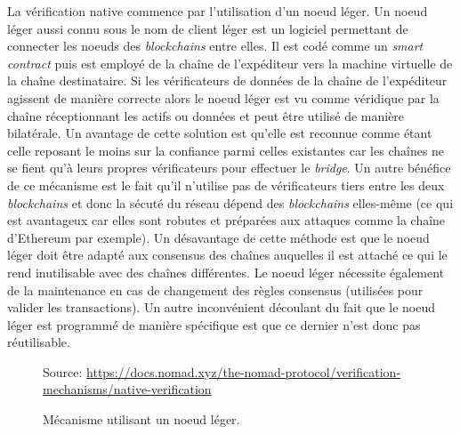 La vérification native commence par l’utilisation d’un \gls{noeud léger}. \cite{NomadDocsNative} Un noeud léger aussi connu sous le nom de client léger est un logiciel permettant de connecter les noeuds des \textit{\gls{blockchain}s} entre elles. Il est codé comme un \textit{\gls{smart contract}} puis est employé de la chaîne de l'expéditeur vers la machine virtuelle de la chaîne destinataire. Si les \gls{vérificateur}s de données de la chaîne de l'expéditeur agissent de manière correcte alors le noeud léger est vu comme véridique par la chaîne réceptionnant les \gls{actif}s ou données et peut être utilisé de manière bilatérale.
 Un avantage de cette solution est qu’elle est reconnue comme étant celle reposant le moins sur la confiance parmi celles existantes car les chaînes ne se fient qu’à leurs propres \gls{vérificateur}s pour effectuer le \textit{bridge}. Un autre bénéfice de ce mécanisme est le fait qu’il n’utilise pas de \gls{vérificateur}s tiers entre les deux \textit{\gls{blockchain}s} et donc la sécuté du réseau dépend des \textit{\gls{blockchain}s} elles-même (ce qui est avantageux car elles sont robutes et préparées aux attaques comme la chaîne d’Ethereum par exemple).
 Un désavantage de cette méthode est que le noeud léger doit être adapté aux consensus des chaînes auquelles il est attaché ce qui le rend inutilisable avec des chaînes différentes. Le noeud léger nécessite également de la maintenance en cas de changement des règles consensus (utilisées pour valider les transactions). Un autre inconvénient découlant du fait que le noeud léger est programmé de manière spécifique est que ce dernier n’est donc pas réutilisable. \\

 \begin{figure}[h!]
    \centering
{}
    {\scriptsize
            Source: \url{https://docs.nomad.xyz/the-nomad-protocol/verification-mechanisms/native-verification}}
    \caption{Mécanisme utilisant un noeud léger.}
    \label{fig:LightClient}
\end{figure}


